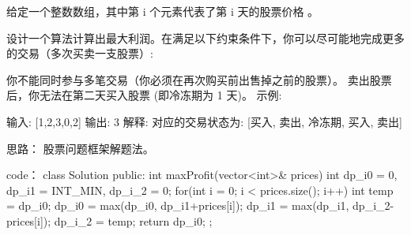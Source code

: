 给定一个整数数组，其中第 i 个元素代表了第 i 天的股票价格 。​

设计一个算法计算出最大利润。在满足以下约束条件下，你可以尽可能地完成更多的交易（多次买卖一支股票）:

你不能同时参与多笔交易（你必须在再次购买前出售掉之前的股票）。
卖出股票后，你无法在第二天买入股票 (即冷冻期为 1 天)。
示例:

输入: [1,2,3,0,2]
输出: 3 
解释: 对应的交易状态为: [买入, 卖出, 冷冻期, 买入, 卖出]
































思路：
股票问题框架解题法。





























code：
class Solution {
public:
    int maxProfit(vector<int>& prices) {
        int dp_i0 = 0, dp_i1 = INT_MIN, dp_i_2 = 0;
        for(int i = 0; i < prices.size(); i++)
        {
            int temp = dp_i0;
            dp_i0 = max(dp_i0, dp_i1+prices[i]);
            dp_i1 = max(dp_i1, dp_i_2-prices[i]);
            dp_i_2 = temp;
        }
        return dp_i0;
    }
};